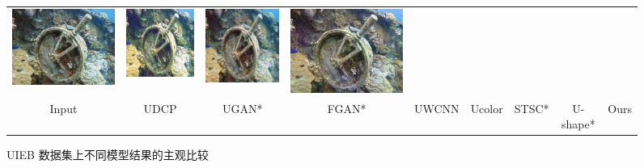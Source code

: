 \begin{figure}[t]
\begin{center}
\begin{tabular}{ccccccccc}
        \includegraphics[width = 0.10\linewidth,height=0.10\linewidth]{figures/ch3/compare/UIEB/Ucolor/41_img_.png}& \hspace{-0.40cm}
        \includegraphics[width = 0.10\linewidth,height=0.10\linewidth]{figures/ch3/compare/UIEB/STSC/41_img_.png}  & \hspace{-0.40cm}
        \includegraphics[width = 0.10\linewidth,height=0.10\linewidth]{figures/ch3/compare/UIEB/Ushape/41_img_.png}& \hspace{-0.40cm} 
        \includegraphics[width = 0.10\linewidth,height=0.10\linewidth]{figures/ch3/compare/UIEB/Ours/41_img_.png} 
        \\
        \scriptsize Input
        & \hspace{-0.51cm} \scriptsize UDCP\cite{udcp}
        & \hspace{-0.51cm} \scriptsize UGAN*\cite{ugan}
        & \hspace{-0.51cm} \scriptsize FGAN*\cite{funie_gan}
        & \hspace{-0.51cm} \scriptsize UWCNN\cite{uwcnn}
        & \hspace{-0.51cm} \scriptsize Ucolor\cite{ucolor}
        & \hspace{-0.51cm} \scriptsize STSC*\cite{stsc}
        & \hspace{-0.51cm} \scriptsize U-shape*\cite{u-shape}
        & \hspace{-0.51cm} \scriptsize Ours
        \\
    \end{tabular}
\end{center}
\vspace{-1mm}
\caption{\label{img:visual-uieb}UIEB 数据集上不同模型结果的主观比较}
\vspace{-1mm}
\end{figure}

